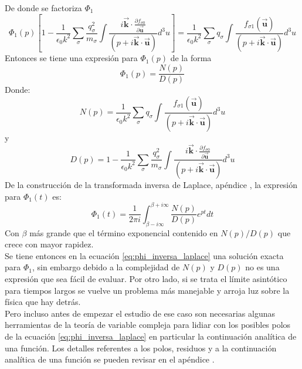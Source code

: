 \documentclass[../tesis_main_file.tex]{subfile}
\begin{document}
De donde se factoriza $\Phi_1$ 
\begin{equation}
\Phi _1 (p)\left[1-\frac{1}{\epsilon_0 k^2}\sum_{\sigma}\frac{q_{\sigma}^2}{m_{\sigma}}\int  \frac{i\overrightarrow{\textbf{k}}\cdot \frac{\partial f_{\sigma 0}}{\partial \overrightarrow{\textbf{u}}}}{(p + i\overrightarrow{\textbf{k}}\cdot \overrightarrow{\textbf{u}})}d^3u \right]=\frac{1}{\epsilon_0 k^2}\sum_{\sigma}q_{\sigma}\int \frac{f_{\sigma 1}(\overrightarrow{\textbf{u}})}{(p + i\overrightarrow{\textbf{k}}\cdot \overrightarrow{\textbf{u}})}d^3u
\end{equation}
Entonces se tiene una expresión para $\Phi_1(p)$ de la forma
\begin{equation}
\label{eq:phi_num_y_denominador}
\Phi_1(p)=\frac{N(p)}{D(p)}
\end{equation}
Donde:
\begin{equation}
\label{eq:funcion_numerador}
N(p)=\frac{1}{\epsilon_0 k^2}\sum_{\sigma}q_{\sigma}\int \frac{f_{\sigma 1}(\overrightarrow{\textbf{u}})}{(p + i\overrightarrow{\textbf{k}}\cdot \overrightarrow{\textbf{u}})}d^3u
\end{equation}
y
\begin{equation}
\label{eq:funcion_denominador}
D(p)=1-\frac{1}{\epsilon_0 k^2}\sum_{\sigma}\frac{q_{\sigma}^2}{m_{\sigma}}\int  \frac{i\overrightarrow{\textbf{k}}\cdot \frac{\partial f_{\sigma 0}}{\partial \overrightarrow{\textbf{u}}}}{(p + i\overrightarrow{\textbf{k}}\cdot \overrightarrow{\textbf{u}})}d^3u
\end{equation}
De la construcción de la transformada inversa de Laplace, apéndice \notinsubfile{\ref{Ap:Laplace}}, la expresión para $\Phi _1(t)$ es:
\begin{equation}
\label{eq:phi_inversa_laplace}
\Phi_1(t) =\frac{1}{2\pi i}\int ^{\beta +i \infty}_{\beta - i\infty} \frac{N(p)}{D(p)}e^{pt}dt
\end{equation}
Con $\beta$ más grande que el término exponencial contenido en $N(p)/D(p)$ que crece con mayor rapidez.\\
Se tiene entonces en la ecuación \ref{eq:phi_inversa_laplace} una solución exacta para $\Phi_1$, sin embargo debido a la complejidad de $N(p)$ y $D(p)$ no es una expresión que sea fácil de evaluar. Por otro lado, si se trata el límite asintótico para tiempos largos se vuelve un problema más manejable y arroja luz sobre la física que hay detrás.\\
Pero incluso antes de empezar el estudio de ese caso son necesarias algunas herramientas de la teoría de variable compleja para lidiar con los posibles polos de la ecuación \ref{eq:phi_inversa_laplace} en particular la continuación analítica de una función. Los detalles referentes a los polos, residuos y a la continuación analítica de una función se pueden revisar en el apéndice \notinsubfile{\ref{Ap:temas_Var_compleja}}.\\
\end{document}
